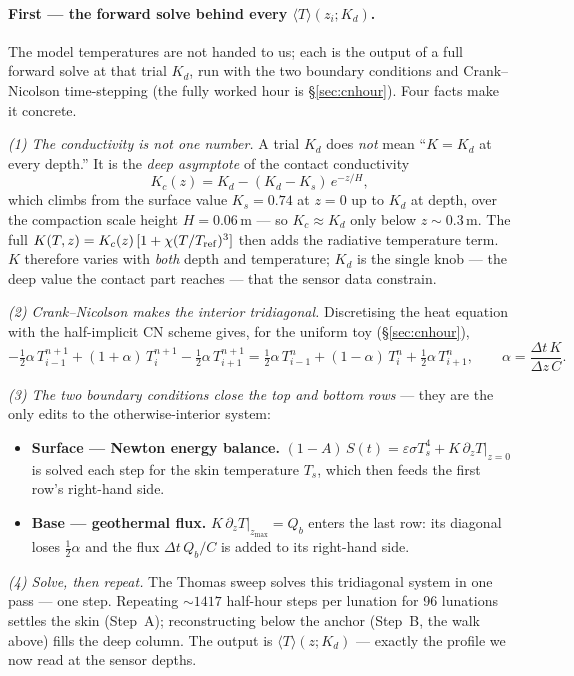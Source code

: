 \documentclass[11pt]{report}
\newcommand{\Tm}{\langle T\rangle}
\begin{document}
\paragraph{First --- the forward solve behind every $\Tm(z_i;K_d)$.} The model
temperatures are not handed to us; each is the output of a full forward solve at that
trial $K_d$, run with the two boundary conditions and Crank--Nicolson time-stepping (the
fully worked hour is \S\ref{sec:cnhour}). Four facts make it concrete.

\emph{(1) The conductivity is not one number.} A trial $K_d$ does \emph{not} mean
``$K=K_d$ at every depth.'' It is the \emph{deep asymptote} of the contact conductivity
\[
K_c(z)=K_d-(K_d-K_s)\,e^{-z/H},
\]
which climbs from the surface value $K_s=0.74$ at $z=0$ up to $K_d$ at depth, over the
compaction scale height $H=0.06$\,m --- so $K_c\approx K_d$ only below $z\sim0.3$\,m. The
full $K(T,z)=K_c(z)\,[1+\chi(T/T_{\rm ref})^3]$ then adds the radiative temperature term.
$K$ therefore varies with \emph{both} depth and temperature; $K_d$ is the single knob ---
the deep value the contact part reaches --- that the sensor data constrain.

\emph{(2) Crank--Nicolson makes the interior tridiagonal.} Discretising the heat equation
with the half-implicit CN scheme gives, for the uniform toy (\S\ref{sec:cnhour}),
\[
-\tfrac12\alpha\,T_{i-1}^{n+1}+(1+\alpha)\,T_i^{n+1}-\tfrac12\alpha\,T_{i+1}^{n+1}
=\tfrac12\alpha\,T_{i-1}^{n}+(1-\alpha)\,T_i^{n}+\tfrac12\alpha\,T_{i+1}^{n},
\qquad\alpha=\frac{\Delta t\,K}{\Delta z\,C}.
\]

\emph{(3) The two boundary conditions close the top and bottom rows} --- they are the only
edits to the otherwise-interior system:
\begin{itemize}[leftmargin=1.6em,itemsep=1pt,topsep=2pt]
\item \textbf{Surface --- Newton energy balance.} $(1-A)\,S(t)=\varepsilon\sigma T_s^4
  +K\,\partial_z T|_{z=0}$ is solved each step for the skin temperature $T_s$, which then
  feeds the first row's right-hand side.
\item \textbf{Base --- geothermal flux.} $K\,\partial_z T|_{z_{\max}}=Q_b$ enters the last
  row: its diagonal loses $\tfrac12\alpha$ and the flux $\Delta t\,Q_b/C$ is added to its
  right-hand side.
\end{itemize}

\emph{(4) Solve, then repeat.} The Thomas sweep solves this tridiagonal system in one pass
--- one step. Repeating ${\sim}1417$ half-hour steps per lunation for 96 lunations settles the
skin (Step~A); reconstructing below the anchor (Step~B, the walk above) fills the deep
column. The output is $\Tm(z;K_d)$ --- exactly the profile we now read at the sensor depths.
\end{document}
